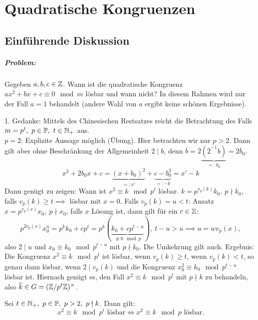 \documentclass[a4paper,twoside,DIV15,BCOR12mm]{scrbook}
\begin{document}
\chapter{Quadratische Kongruenzen}
\section{Einführende Diskussion}
\paragraph{Problem:} Gegeben $a,b,c \in \mathbb{Z}$. Wann ist die
quadratische Kongruenz $ax^2+bx+c \equiv 0 \mod m$ lösbar und wann
nicht? In diesem Rahmen wird nur der Fall $a=1$ behandelt (andere
Wahl von $a$ ergibt keine schönen Ergebnisse).

1. Gedanke: Mittels des Chinesischen Restsatzes reicht die
Betrachtung des Falls $m=p^t,\ p\in \MdP,\ t\in \MdN_+$ aus.\\
$p=2$: Explizite Aussage möglich (Übung). Hier betrachten wir nur
$p>2$. Dann gilt aber ohne Beschränkung der Allgemeinheit $2 \mid
b$, denn $\overline b=\overline 2 \underbrace{(\overline
2^{-1}b)}_{=: b_0} =2\overline b_0$.\\
\[
    x^2+2b_0x+c=\underbrace{(x+b_0)^2}_{=:x'}+\underbrace{c-b_0^2}_{=:-k}=x'-k
\]
Dann genügt zu zeigen: Wann ist $x^2\equiv k \mod p^t$ lösbar.
$k=p^{v_p(k)} k_0,\ p \nmid k_0$, falls $v_p(k)\geq t \implies$
lösbar mit $x=0$. Falls $v_p(k)=u < t$: Ansatz $x=p^{v_p(x)}x_0,\ p
\nmid x_0$, falls $x$ Lösung ist, dann gilt für ein $c\in \mathbb{Z}$:
\[
    p^{2v_p(x)} x_0^n=p^k k_0 + c
    p^t=p^k(\underbrace{k_0+cp^{t-u}}_{\not \equiv 0 \mod p}),\
    t-u>u \implies u=w v_p(x),
\]
also $2\mid u$ und $x_0 \equiv k_0 \mod p^{t-u}$ mit $p \nmid k_0$.
Die Umkehrung gilt auch. Ergebnis: Die Kongruenz $x^2 \equiv k \mod
p^t$ ist lösbar, wenn $v_p(k)\geq t$, wenn $v_p(k) < t$, so genau
dann lösbar, wenn $2 \mid v_p(k)$ und die Kongruenz $x_0^2 \equiv
k_0 \mod p^{t-u}$ lösbar ist. Hiernach genügt es, den Fall $x^2
\equiv k \mod p^t$ mit $p\nmid k$ zu behandeln, also $\overline k
\in G=(\mathbb{Z}/p^t\mathbb{Z})^{\times}$.
\begin{hilfssatz}
    Sei $t \in \mathbb{N}_+,\ p \in \mathbb{P},\ p>2,\ p \nmid k$. Dann gilt:
    \[
        x^2\equiv k \mod p^t \text{ lösbar} \iff x^2 \equiv k \mod p
        \text{ lösbar}.
    \]
\end{hilfssatz}
\end{document}
